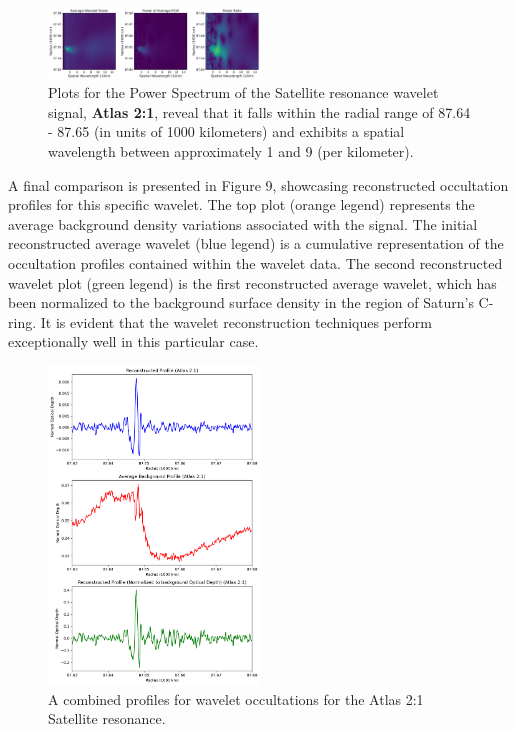 \documentclass[conference]{IEEEtran}
\begin{document}
\begin{figure}[h]
\centering
\includegraphics[width=0.5\textwidth]{power_ratio_plotw87.png}
\caption{Plots for the Power Spectrum of the Satellite resonance wavelet signal, 
\textbf{Atlas 2:1}, reveal that it falls within the radial range of 87.64 - 87.65 (in units of 1000 kilometers) and exhibits a spatial wavelength between approximately 1 and 9 (per kilometer).} 
\label{fig:my_label}
\end{figure}

A final comparison is presented in Figure 9, showcasing reconstructed occultation profiles for this specific wavelet. The top plot (orange legend) represents the average background density variations associated with the signal. The initial reconstructed average wavelet (blue legend) is a cumulative representation of the occultation profiles contained within the wavelet data. The second reconstructed wavelet plot (green legend) is the first reconstructed average wavelet, which has been normalized to the background surface density in the region of Saturn's C-ring. It is evident that the wavelet reconstruction techniques perform exceptionally well in this particular case.
\begin{figure}
\centering
\includegraphics[width=0.5\textwidth]{combinedprofiles_atlas21.png}
\caption{A combined profiles for wavelet occultations for the Atlas 2:1 Satellite resonance.} 
\label{fig:my_label}
\end{figure}
\end{document}
